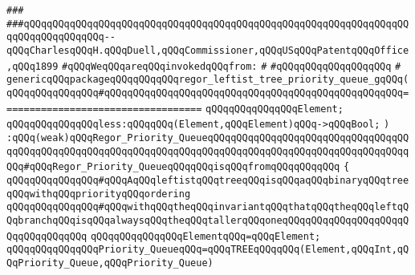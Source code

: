\verb|###|\newline
\verb|###qQQqqQQqqQQqqQQqqQQqqQQqqQQqqQQqqQQqqQQqqQQqqQQqqQQqqQQqqQQqqQQqqQQqqQQqqQQqqQQqqQQq--qQQqCharlesqQQqH.qQQqDuell,qQQqCommissioner,qQQqUSqQQqPatentqQQqOffice,qQQq1899|\newline
\newline
\newline
\verb|#qQQqWeqQQqareqQQqinvokedqQQqfrom:|\newline
\verb|#|\newline
\verb|#qQQqqQQqqQQqqQQqqQQq|\newline
\verb|#|\newline
\verb|genericqQQqpackageqQQqqQQqqQQqregor_leftist_tree_priority_queue_gqQQq(|\newline
\verb|qQQqqQQqqQQqqQQq#qQQqqQQqqQQqqQQqqQQqqQQqqQQqqQQqqQQqqQQqqQQqqQQqqQQq===================================|\newline
\newline
\verb|qQQqqQQqqQQqqQQqElement;|\newline
\newline
\verb|qQQqqQQqqQQqqQQqless:qQQqqQQq(Element,qQQqElement)qQQq->qQQqBool;|\newline
\verb|)|\newline
\verb|:qQQq(weak)qQQqRegor_Priority_QueueqQQqqQQqqQQqqQQqqQQqqQQqqQQqqQQqqQQqqQQqqQQqqQQqqQQqqQQqqQQqqQQqqQQqqQQqqQQqqQQqqQQqqQQqqQQqqQQqqQQqqQQqqQQq#qQQqRegor_Priority_QueueqQQqqQQqisqQQqfromqQQqqQQqqQQq|\newline
\verb|{|\newline
\verb|qQQqqQQqqQQqqQQq#qQQqAqQQqleftistqQQqtreeqQQqisqQQqaqQQqbinaryqQQqtreeqQQqwithqQQqpriorityqQQqordering|\newline
\verb|qQQqqQQqqQQqqQQq#qQQqwithqQQqtheqQQqinvariantqQQqthatqQQqtheqQQqleftqQQqbranchqQQqisqQQqalwaysqQQqtheqQQqtallerqQQqoneqQQqqQQqqQQqqQQqqQQqqQQqqQQqqQQqqQQq|\newline
\newline
\verb|qQQqqQQqqQQqqQQqElementqQQq=qQQqElement;|\newline
\newline
\verb|qQQqqQQqqQQqqQQqPriority_QueueqQQq=qQQqTREEqQQqqQQq(Element,qQQqInt,qQQqPriority_Queue,qQQqPriority_Queue)|\newline
